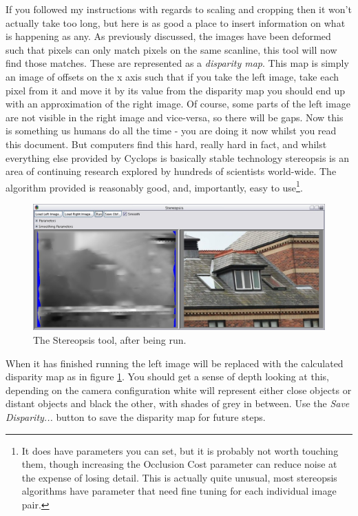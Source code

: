 \documentclass[10pt,a4paper,twoside]{article}
\begin{document}
If you followed my instructions with regards to scaling and cropping then it won't actually take too long, but here is as good a place to insert information on what is happening as any. As previously discussed, the images have been deformed such that pixels can only match pixels on the same scanline, this tool will now find those matches. These are represented as a \emph{disparity map}. This map is simply an image of offsets on the x axis such that if you take the left image, take each pixel from it and move it by its value from the disparity map you should end up with an approximation of the right image. Of course, some parts of the left image are not visible in the right image and vice-versa, so there will be gaps. Now this is something us humans do all the time - you are doing it now whilst you read this document. But computers find this hard, really hard in fact, and whilst everything else provided by Cyclops is basically stable technology stereopsis is an area of continuing research explored by hundreds of scientists world-wide. The algorithm provided is reasonably good, and, importantly, easy to use\footnote{It does have parameters you can set, but it is probably not worth touching them, though increasing the Occlusion Cost parameter can reduce noise at the expense of losing detail. This is actually quite unusual, most stereopsis algorithms have parameter that need fine tuning for each individual image pair.}.

\begin{figure}
 \centering
 \includegraphics[width=1.0\textwidth]{screenshots/stereo_after}
 \caption{The Stereopsis tool, after being run.}
 \label{fig:stereo_after}
\end{figure}

When it has finished running the left image will be replaced with the calculated disparity map as in figure \ref{fig:stereo_after}. You should get a sense of depth looking at this, depending on the camera configuration white will represent either close objects or distant objects and black the other, with shades of grey in between. Use the \emph{Save Disparity...} button to save the disparity map for future steps.
\end{document}
